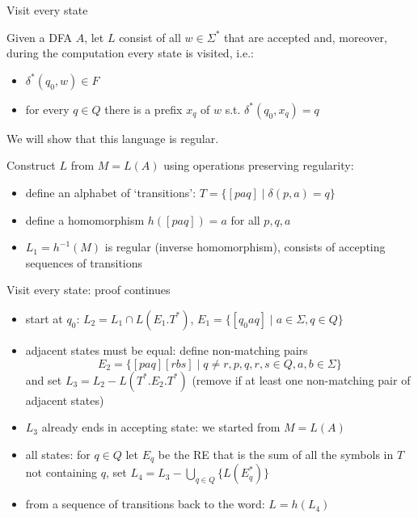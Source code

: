 \documentclass[handout]{beamer}
\begin{document}
\begin{frame}{Visit every state}

    \begin{example}
        Given a DFA $A$, let $L$ consist of all $w\in\Sigma^*$ that are accepted and, moreover, during the computation every state is visited, i.e.:
        \begin{itemize}
            \item $\delta^*(q_0,w)\in F$
            \item for every $q\in Q$ there is a prefix $x_q$ of $w$ s.t. $\delta^*(q_0,x_q)=q$
        \end{itemize}
        We will show that this language is regular.
    \end{example}
    Construct $L$ from $M=L(A)$ using operations preserving regularity:

    \begin{itemize}
        \item define an alphabet of `transitions': $T=\{[paq]\mid \delta(p,a)=q\}$
        \item define a homomorphism $h([paq])=a$ for all $p,q,a$
        \item $L_1=h^{-1}(M)$ is regular (inverse homomorphism), consists of accepting sequences of transitions
    \end{itemize}

\end{frame}


\begin{frame}{Visit every state: proof continues}

    \begin{itemize}
        \item start at $q_0$: $L_2=L_1\cap L(E_1.T^*)$, $E_1=\{[q_0aq]\mid a\in \Sigma, q\in Q\}$
        \item adjacent states must be equal: define non-matching pairs
        $$
        E_2=\{[paq][rbs]\mid q\neq r, p,q,r,s\in Q, a,b \in \Sigma\}$$
        and set $L_3=L_2-L(T^*.E_2.T^*)$ (remove if at least one non-matching pair of adjacent states)            
        \item $L_3$ already ends in accepting state: we started from $M=L(A)$
        \item all states: for $q\in Q$ let $E_q$ be the RE that is the sum of all the symbols in $T$ not containing $q$, set 
        $L_4=L_3-\bigcup_{q \in Q}\{L(E_q^*)\}$
        \item from a sequence of transitions back to the word: $L=h(L_4)$
    \end{itemize}\hfill\qedsymbol

\end{frame}
\end{document}

